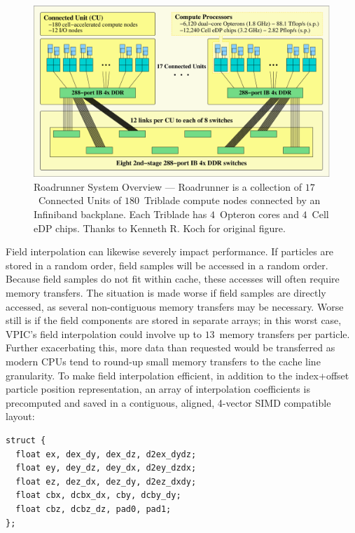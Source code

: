 \documentclass[journal,twoside]{IEEEtran}
\begin{document}
\begin{figure}
\begin{center}
\includegraphics[width=7in]{figs/system.eps}
\caption{Roadrunner System Overview --- Roadrunner is a collection
of $17$~Connected Units of $180$~Triblade compute nodes connected by
an Infiniband backplane.  Each Triblade has $4$~Opteron cores and
$4$~Cell eDP chips. Thanks to Kenneth R. Koch for original figure.}
\label{fig:system}
\end{center}
\end{figure}

Field interpolation can likewise severely impact performance.  If
particles are stored in a random order, field samples will be accessed
in a random order.  Because field samples do not fit within cache,
these accesses will often require memory transfers.  The situation is
made worse if field samples are directly accessed, as several
non-contiguous memory transfers may be necessary.  Worse still is if
the field components are stored in separate arrays; in this worst
case, VPIC's field interpolation could involve up to $13$~memory
transfers per particle.  Further exacerbating this, more data than
requested would be transferred as modern CPUs tend to round-up small
memory transfers to the cache line granularity.  To make field
interpolation efficient, in addition to the index+offset particle
position representation, an array of interpolation coefficients is
precomputed and saved in a contiguous, aligned, 4-vector SIMD
compatible layout:
\begin{verbatim}
struct {
  float ex, dex_dy, dex_dz, d2ex_dydz;
  float ey, dey_dz, dey_dx, d2ey_dzdx;
  float ez, dez_dx, dez_dy, d2ez_dxdy;
  float cbx, dcbx_dx, cby, dcby_dy;
  float cbz, dcbz_dz, pad0, pad1;
};
\end{verbatim}
\end{document}
